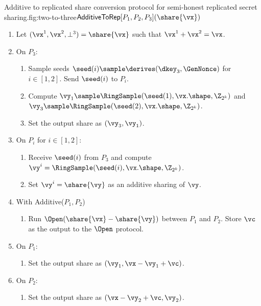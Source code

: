 
\begin{Boxfig}{Additive to replicated share conversion protocol for semi-honest
replicated secret sharing.}{fig:two-to-three}{$\mathsf{AdditiveToRep}[P_1, P_2, P_3](\share{\vx})$}
\begin{enumerate}
\item Let $(\vx^1, \vx^2, \bot^3) = \share{\vx}$ such that $\vx^1 + \vx^2 = \vx$.
\item On $P_3$:
\begin{enumerate}
  \item Sample seeds $\seed(i) \sample \derives(\dkey_3, \GenNonce)$ for $i \in [1, 2]$. Send $\seed(i)$ to $P_i$.
  \item Compute $\vy_1 \sample \RingSample(\seed(1), \vx.\shape, \Z_{2^k})$
  and $\vy_3 \sample \RingSample(\seed(2), \vx.\shape, \Z_{2^k})$.
  \item Set
  the output share as $(\vy_3, \vy_1)$.
\end{enumerate}

\item On $P_i$ for $i \in [1,2]$:
\begin{enumerate}
   \item Receive $\seed(i)$ from $P_3$ and compute $\vy^i = \RingSample(\seed(i), \vx.\shape, \Z_{2^k})$.
  \item Set $\vy^i = \share{\vy}$ as an additive sharing of $\vy$.
\end{enumerate}
\item With Additive($P_1, P_2$)
\begin{enumerate}
  \item Run $\Open(\share{\vx} - \share{\vy})$ between $P_1$ and $P_2$. Store $\vc$ as the output
to the $\Open$ protocol.
\end{enumerate}
\item On $P_1$:
\begin{enumerate}
  \item Set the output share as $(\vy_1, \vx - \vy_1 + \vc)$.
\end{enumerate}
\item On $P_2$:
\begin{enumerate}
  \item Set the output share as $(\vx - \vy_2 + \vc, \vy_2)$.
\end{enumerate}
\end{enumerate}
\end{Boxfig}

